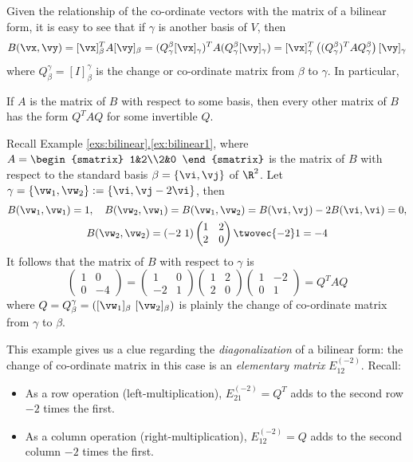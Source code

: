 Given the relationship of the co-ordinate vectors with the matrix of a bilinear form, it is easy to see that if $\gamma$ is another basis of $V$, then
\[B(\vx,\vy)=[\vx]_\beta^TA[\vy]_\beta =(Q_\gamma^\beta[\vx]_\gamma)^TA(Q_\gamma^\beta[\vy]_\gamma) =[\vx]_\gamma^T\left((Q_\gamma^\beta)^TAQ_\gamma^\beta\right)[\vy]_\gamma\]
where $Q_\beta^\gamma=[I]_\beta^\gamma$ is the change or co-ordinate matrix from $\beta$ to $\gamma$. In particular,
\begin{lemm}{}{}
If $A$ is the matrix of $B$ with respect to some basis, then every other matrix of $B$ has the form $Q^TAQ$ for some invertible $Q$.
\end{lemm}

\begin{example}{}{}
Recall Example \hyperref[ex:bilinear1]{\ref*{exs:bilinear}.\ref*{ex:bilinear1}}, where $A=\begin{smatrix}
	1&2\\2&0
\end{smatrix}$ is the matrix of $B$ with respect to the standard basis $\beta=\{\vi,\vj\}$ of $\R^2$. Let $\gamma=\{\vw_1,\vw_2\}:=\{\vi,\vj-2\vi\}$, then
\begin{gather*}
B(\vw_1,\vw_1)=1,\quad B(\vw_2,\vw_1)=B(\vw_1,\vw_2)=B(\vi,\vj)-2B(\vi,\vi)=0,\\
B(\vw_2,\vw_2)=(-2\ 1)\begin{pmatrix}
	1&2\\2&0
\end{pmatrix}\twovec{-2}1 =-4
\end{gather*}
It follows that the matrix of $B$ with respect to $\gamma$ is
\[\begin{pmatrix}
	1&0\\0&-4
\end{pmatrix}
=\begin{pmatrix}
	1&0\\-2&1
\end{pmatrix}
\begin{pmatrix}
	1&2\\2&0
\end{pmatrix}
\begin{pmatrix}
	1&-2\\0&1
\end{pmatrix}
=Q^TAQ
\]
where $Q=Q_\beta^\gamma=([\vw_1]_\beta\ [\vw_2]_\beta)$ is plainly the change of co-ordinate matrix from $\gamma$ to $\beta$.
\end{example}

This example gives us a clue regarding the \emph{diagonalization} of a bilinear form: the change of co-ordinate matrix in this case is an \emph{elementary matrix} $E_{12}^{(-2)}$. Recall:
\begin{itemize}
  \item As a row operation (left-multiplication), $E_{21}^{(-2)}=Q^T$ adds to the second row $-2$ times the first.
  \item As a column operation (right-multiplication), $E_{12}^{(-2)}=Q$ adds to the second column $-2$ times the first.
\end{itemize}

